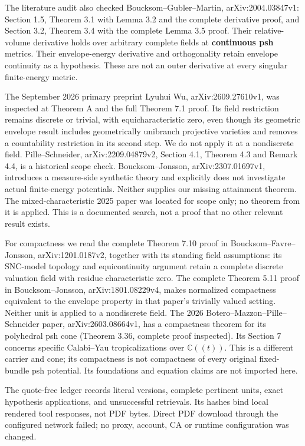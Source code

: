 \documentclass[
]{article}
\begin{document}
The literature audit also checked Boucksom--Gubler--Martin,
arXiv:2004.03847v1: Section 1.5, Theorem 3.1 with Lemma 3.2 and the
complete derivative proof, and Section 3.2, Theorem 3.4 with the
complete Lemma 3.5 proof. Their relative-volume derivative holds over
arbitrary complete fields at \textbf{continuous psh} metrics. Their
envelope-energy derivative and orthogonality retain envelope continuity
as a hypothesis. These are not an outer derivative at every singular
finite-energy metric.

The September 2026 primary preprint Lyuhui Wu, arXiv:2609.27610v1, was
inspected at Theorem A and the full Theorem 7.1 proof. Its field
restriction remains discrete or trivial, with equicharacteristic zero,
even though its geometric envelope result includes geometrically
unibranch projective varieties and removes a countability restriction in
its second step. We do not apply it at a nondiscrete field.
Pille--Schneider, arXiv:2209.04879v2, Section 4.1, Theorem 4.3 and
Remark 4.4, is a historical scope check. Boucksom--Jonsson,
arXiv:2307.01697v1, introduces a measure-side synthetic theory and
explicitly does not investigate actual finite-energy potentials. Neither
supplies our missing attainment theorem. The mixed-characteristic 2025
paper was located for scope only; no theorem from it is applied. This is
a documented search, not a proof that no other relevant result exists.

For compactness we read the complete Theorem 7.10 proof in
Boucksom--Favre--Jonsson, arXiv:1201.0187v2, together with its standing
field assumptions: its SNC-model topology and equicontinuity argument
retain a complete discrete valuation field with residue characteristic
zero. The complete Theorem 5.11 proof in Boucksom--Jonsson,
arXiv:1801.08229v4, makes normalized compactness equivalent to the
envelope property in that paper's trivially valued setting. Neither unit
is applied to a nondiscrete field. The 2026
Botero--Mazzon--Pille--Schneider paper, arXiv:2603.08664v1, has a
compactness theorem for its polyhedral psh cone (Theorem 3.36, complete
proof inspected). Its Section 7 concerns specific Calabi--Yau
tropicalizations over \(\mathbb C((t))\). This is a different carrier
and cone; its compactness is not compactness of every original
fixed-bundle psh potential. Its foundations and equation claims are not
imported here.

The quote-free ledger records literal versions, complete pertinent
units, exact hypothesis applications, and unsuccessful retrievals. Its
hashes bind local rendered tool responses, not PDF bytes. Direct PDF
download through the configured network failed; no proxy, account, CA or
runtime configuration was changed.
\end{document}
